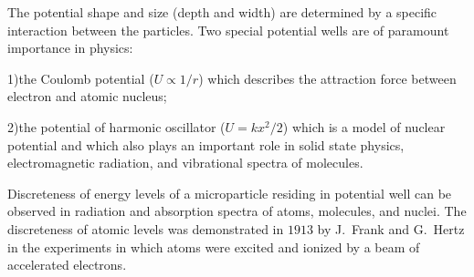 The potential shape and size (depth and width) are determined by a specific interaction between the particles. Two special potential wells are of paramount importance in physics:

1)\;the Coulomb potential ($U\propto1/r$) which describes the attraction force between electron and atomic nucleus;

2)\;the potential of harmonic oscillator ($U=kx^2/2$) which is a model of nuclear potential and which also plays an important role in solid state physics, electromagnetic radiation, and vibrational spectra of molecules.

Discreteness of energy levels of a microparticle residing in potential well can be observed  in radiation and absorption spectra of atoms, molecules, and nuclei. The discreteness of atomic levels was demonstrated in $1913$ by J.~Frank and G.~Hertz in the experiments in which atoms were excited and ionized by a beam of accelerated electrons.